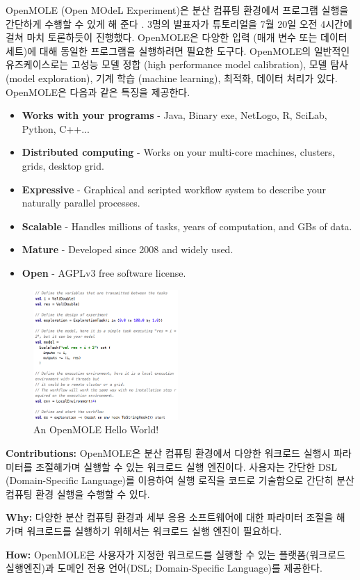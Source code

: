 \documentclass[twocolumn]{article}
\newcommand{\bi}{\begin{itemize}}
\newcommand{\ei}{\end{itemize}}
\newcommand{\ii}{\item}
\begin{document}
OpenMOLE (Open MOdeL Experiment)은 분산 컴퓨팅 환경에서 프로그램 실행을 간단하게 수행할 수 있게 해 준다 \cite{openmole:2015}. 3명의 발표자가 튜토리얼을 7월 20일 오전 4시간에 걸쳐 마치 토론하듯이 진행했다.
OpenMOLE은 다양한 입력 (매개 변수 또는 데이터 세트)에 대해 동일한 프로그램을 실행하려면 필요한 도구다. 
OpenMOLE의 일반적인 유즈케이스로는 고성능 모델 정합 (high performance model calibration), 모델 탐사 (model exploration), 기계 학습 (machine learning), 최적화, 데이터 처리가 있다. OpenMOLE은 다음과 같은 특징을 제공한다.
\bi
\ii \textbf{Works with your programs} - Java, Binary exe, NetLogo, R, SciLab, Python, C++...
\ii \textbf{Distributed computing} - Works on your multi-core machines, clusters, grids, desktop grid.
\ii \textbf{Expressive} - Graphical and scripted workflow system to describe your naturally parallel processes.
\ii \textbf{Scalable} - Handles millions of tasks, years of computation, and GBs of data.
\ii \textbf{Mature} - Developed since 2008 and widely used.
\ii \textbf{Open} - AGPLv3 free software license.
\ei

\begin{figure}[htb]
        \centering
        \includegraphics[width=0.49\textwidth]{openmole-code.png}
        \caption{An OpenMOLE Hello World!}
        \label{fig:openmole-code}
\end{figure}

\noindent
\textbf{Contributions:} OpenMOLE은 분산 컴퓨팅 환경에서 다양한 워크로드 실행시 파라미터를 조절해가며 실행할 수 있는 워크로드 실행 엔진이다. 
사용자는 간단한 DSL (Domain-Specific Language)를 이용하여 실행 로직을 코드로 기술함으로 간단히 분산 컴퓨팅 환경 실행을 수행할 수 있다.

\noindent
\textbf{Why:} 다양한 분산 컴퓨팅 환경과 세부 응용 소프트웨어에 대한 파라미터 조절을 해 가며 워크로드를 실행하기 위해서는 워크로드 실행 엔진이 필요하다.

\noindent
\textbf{How:} OpenMOLE은 사용자가 지정한 워크로드를 실행할 수 있는 플랫폼(워크로드 실행엔진)과 도메인 전용 언어(DSL; Domain-Specific Language)를 제공한다.
\end{document}
